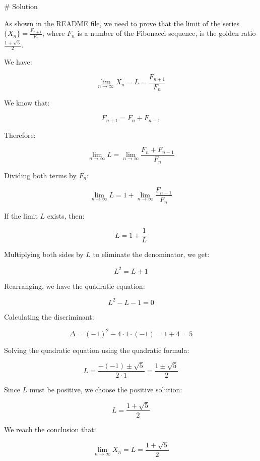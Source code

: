 # Solution

As shown in the README file, we need to prove that the limit of the series \( \{X_n\} = \frac{F_{n+1}}{F_n} \), where \( F_n \) is a number of the Fibonacci sequence, is the golden ratio \( \frac{1 + \sqrt{5}}{2} \).

We have:

\[
\lim_{{n \to \infty}} X_n = L = \frac{F_{n+1}}{F_n}
\]

We know that:

\[
F_{n+1} = F_n + F_{n-1}
\]

Therefore:

\[
\lim_{{n \to \infty}} L = \lim_{{n \to \infty}} \frac{F_n + F_{n-1}}{F_n}
\]

Dividing both terms by \( F_n \):

\[
\lim_{{n \to \infty}} L = 1 + \lim_{{n \to \infty}} \frac{F_{n-1}}{F_n}
\]

If the limit \( L \) exists, then:

\[
L = 1 + \frac{1}{L}
\]

Multiplying both sides by \( L \) to eliminate the denominator, we get:

\[
L^2 = L + 1
\]

Rearranging, we have the quadratic equation:

\[
L^2 - L - 1 = 0
\]

Calculating the discriminant:

\[
\Delta = (-1)^2 - 4 \cdot 1 \cdot (-1) = 1 + 4 = 5
\]

Solving the quadratic equation using the quadratic formula:

\[
L = \frac{-(-1) \pm \sqrt{5}}{2 \cdot 1} = \frac{1 \pm \sqrt{5}}{2}
\]

Since \( L \) must be positive, we choose the positive solution:

\[
L = \frac{1 + \sqrt{5}}{2}
\]

We reach the conclusion that:

\[
\lim_{{n \to \infty}} X_n = L = \frac{1 + \sqrt{5}}{2}
\]

